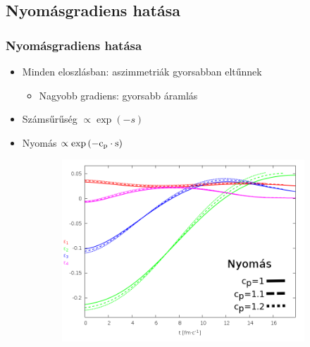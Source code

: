 \documentclass{beamer}
\begin{document}
\begin{frame}
\begin{center}
\begin{figure}[H]
\begin{subfigure}[b]{0.49\textwidth}
	\end{subfigure}
\end{figure}
\end{center}
\end{frame}

\subsection{Nyomásgradiens hatása}
\begin{frame}
\frametitle{Nyomásgradiens hatása}
\begin{center}
\begin{itemize}
\setlength{\itemsep}{12pt}
\item<1-> Minden eloszlásban: aszimmetriák gyorsabban eltűnnek
\begin{itemize}
\vspace{8pt}
\item<1-> Nagyobb gradiens: gyorsabb áramlás
\end{itemize}
\item<1-> Számsűrűség $\propto \exp{(-s)}$
\item<1-> Nyomás $\propto \exp{(-\rm{c_p}\cdot s)}$
\end{itemize}
\begin{figure}[H]
	\centering
    \begin{subfigure}[b]{0.49\textwidth}
    		\includegraphics[width=\textwidth]{pic/res/rel/eps_pc_p}
	\end{subfigure}
	\begin{subfigure}[b]{0.49\textwidth}

\end{subfigure}
\end{figure}
\end{center}
\end{frame}
\end{document}
